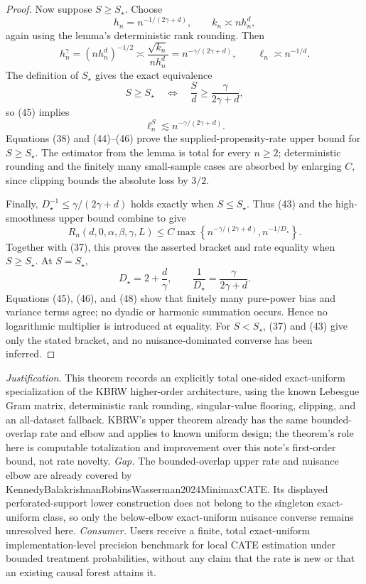 \documentclass{article}
\begin{document}
\begin{proof}
Now suppose \(S\geq S_\star\).  Choose
\[
 h_n=n^{-1/(2\gamma+d)},
 \qquad
 k_n\asymp nh_n^d,
 \tag{44}
\]
again using the lemma's deterministic rank rounding.  Then
\[
 h_n^\gamma=(nh_n^d)^{-1/2}\asymp\frac{\sqrt{k_n}}{nh_n^d}
 =n^{-\gamma/(2\gamma+d)},
 \qquad
 \ell_n\asymp n^{-1/d}.
 \tag{45}
\]
The definition of \(S_\star\) gives the exact equivalence
\[
 S\geq S_\star
 \quad\Longleftrightarrow\quad
 \frac Sd\geq\frac\gamma{2\gamma+d},
\]
so (45) implies
\[
 \ell_n^S\lesssim n^{-\gamma/(2\gamma+d)}.
 \tag{46}
\]
Equations (38) and (44)--(46) prove the supplied-propensity-rate upper bound for \(S\geq S_\star\).  The estimator from the lemma is total for every \(n\geq2\); deterministic rounding and the finitely many small-sample cases are absorbed by enlarging \(C\), since clipping bounds the absolute loss by \(3/2\).

Finally, \(D_\star^{-1}\leq\gamma/(2\gamma+d)\) holds exactly when \(S\leq S_\star\).  Thus (43) and the high-smoothness upper bound combine to give
\[
 R_n(d,0,\alpha,\beta,\gamma,L)
 \leq C\max\left\{n^{-\gamma/(2\gamma+d)},n^{-1/D_\star}\right\}.
 \tag{47}
\]
Together with (37), this proves the asserted bracket and rate equality when \(S\geq S_\star\).  At \(S=S_\star\),
\[
 D_\star=2+\frac d\gamma,
 \qquad
 \frac1{D_\star}=\frac\gamma{2\gamma+d}.
 \tag{48}
\]
Equations (45), (46), and (48) show that finitely many pure-power bias and variance terms agree; no dyadic or harmonic summation occurs.  Hence no logarithmic multiplier is introduced at equality.  For \(S<S_\star\), (37) and (43) give only the stated bracket, and no nuisance-dominated converse has been inferred.
\end{proof}
\par\smallskip\noindent \textit{Justification.} This theorem records an explicitly total one-sided exact-uniform specialization of the KBRW higher-order architecture, using the known Lebesgue Gram matrix, deterministic rank rounding, singular-value flooring, clipping, and an all-dataset fallback.  KBRW's upper theorem already has the same bounded-overlap rate and elbow and applies to known uniform design; the theorem's role here is computable totalization and improvement over this note's first-order bound, not rate novelty. \textit{Gap.} The bounded-overlap upper rate and nuisance elbow are already covered by KennedyBalakrishnanRobinsWasserman2024MinimaxCATE.  Its displayed perforated-support lower construction does not belong to the singleton exact-uniform class, so only the below-elbow exact-uniform nuisance converse remains unresolved here. \textit{Consumer.} Users receive a finite, total exact-uniform implementation-level precision benchmark for local CATE estimation under bounded treatment probabilities, without any claim that the rate is new or that an existing causal forest attains it.
\end{document}
